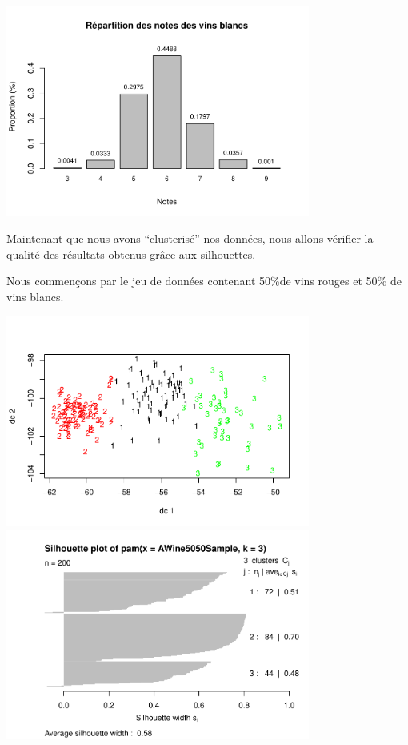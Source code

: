 \documentclass[
]{article}
\begin{document}
\begin{center}
	\includegraphics[width=10cm]{repport_files/figure-latex/unnamed-chunk-11-1.pdf}
\end{center}

Maintenant que nous avons ``clusterisé'' nos données, nous allons
vérifier la qualité des résultats obtenus grâce aux silhouettes.

Nous commençons par le jeu de données contenant 50\%de vins rouges et
50\% de vins blancs.
\begin{center}
	\includegraphics[width=10cm]{repport_files/figure-latex/unnamed-chunk-12-1.pdf}
	\includegraphics[width=10cm]{repport_files/figure-latex/unnamed-chunk-12-2.pdf} 
\end{center}
\end{document}
